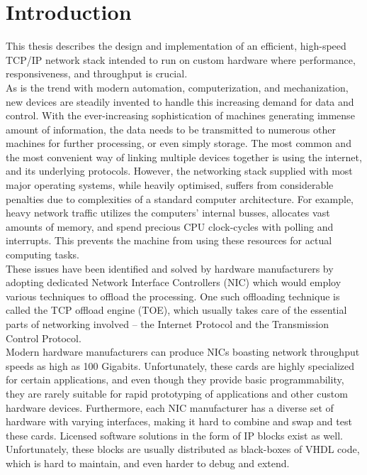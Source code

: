\chapter{Introduction}
This thesis describes the design and implementation of an efficient, high-speed
TCP/IP network stack intended to run on custom hardware where performance, responsiveness,
and throughput is crucial.\\

As is the trend with modern automation, computerization, and mechanization, new 
devices are steadily invented to handle this increasing demand for data and 
control. 
With the ever-increasing sophistication of machines generating immense amount 
of information, the data needs to be transmitted to numerous other machines for
further processing, or even simply storage. The most common and the most convenient
way of linking multiple devices together is using the internet, and its underlying
protocols. However, the networking stack supplied with most major operating 
systems, while heavily optimised, suffers from considerable penalties due to 
complexities of a standard computer architecture. For example, heavy network
traffic utilizes the computers' internal busses, allocates vast amounts of 
memory, and spend precious CPU clock-cycles with polling and interrupts. This
prevents the machine from using these resources for actual computing tasks.\\
These issues have been identified and solved by hardware manufacturers by
adopting dedicated Network Interface Controllers (NIC) which would employ
various techniques to offload the processing. One such offloading technique is 
called the TCP offload engine (TOE), which usually takes care of the essential
parts of networking involved -- the Internet Protocol and the Transmission 
Control Protocol\cite{TCP_offload_dumb_idea}.\\
Modern hardware manufacturers can produce NICs boasting network throughput 
speeds as high as 100 Gigabits\cite{xilinx_100g_nic}. Unfortunately, these cards 
are highly specialized for certain applications, and even though they provide 
basic programmability, they are rarely suitable for rapid prototyping of
applications and other custom hardware devices. Furthermore, each NIC manufacturer
has a diverse set of hardware with varying interfaces, making it hard to 
combine and swap and test these cards.
Licensed software solutions in the form of IP blocks exist as well. Unfortunately,
these blocks are usually distributed as black-boxes of VHDL code, which is 
hard to maintain, and even harder to debug and extend.  \\


